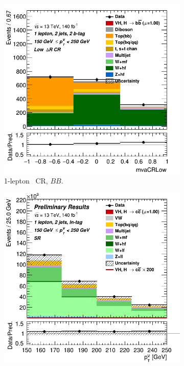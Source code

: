 \begin{figure}[h!]
  \centering
  \begin{subfigure}[b]{0.32\textwidth}
      \centering
      \includegraphics[width=\textwidth]{Images/VH/Own_fit/prefit_VHbb/Region_distmvaCRLow_BMax250_BMin150_DCRLow_J2_TTypebb_T2_L1_Y6051_Prefit.png}
      \caption{1-lepton \lowdr\ CR, $BB$.}
      \label{fig:plots_VHb_ex_1L_CRL}
  \end{subfigure}
  \begin{subfigure}[b]{0.32\textwidth}
      \centering
      \includegraphics[width=\textwidth]{Images/VH/Own_fit/prefit_VHcc/Region_distpTV_BMax250_BMin150_DSR_J2_TTypeln_T1_L1_Y6051_Prefit.png}

\end{subfigure}
\end{figure}
